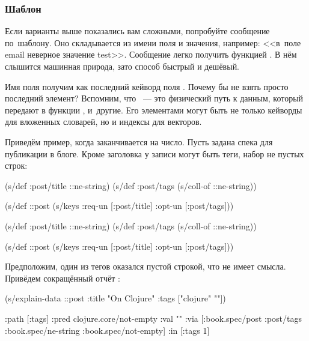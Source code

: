 \subsubsection*{Шаблон}


Если варианты выше показались вам сложными, попробуйте сообщение по~шаблону. Оно
складывается из имени поля и значения, например: <<в~поле email неверное
значение test>>. Сообщение легко получить функцией . В нём
слышится машинная природа, зато способ быстрый и дешёвый.

Имя поля получим как последний кейворд поля . Почему бы не взять
просто последний элемент? Вспомним, что ~--- это физический путь к данным,
который передают в функции ,  и~другие. Его
элементами могут быть не только кейворды для вложенных словарей, но и индексы
для векторов.

Приведём пример, когда  заканчивается на число. Пусть задана
спека  для публикации в блоге. Кроме заголовка у записи могут
быть теги, набор не пустых строк:

\ifnarrow

\begin{clojure}
(s/def :post/title ::ne-string)
(s/def :post/tags
  (s/coll-of ::ne-string))

(s/def ::post
  (s/keys :req-un [:post/title]
          :opt-un [:post/tags]))
\end{clojure}

\else

\begin{clojure}
(s/def :post/title ::ne-string)
(s/def :post/tags (s/coll-of ::ne-string))

(s/def ::post (s/keys :req-un [:post/title]
                      :opt-un [:post/tags]))
\end{clojure}

\fi

Предположим, один из тегов оказался пустой строкой, что не имеет
смысла. Привёдем сокращённый отчёт :

\ifnarrow

\begin{clojure}
(s/explain-data ::post
  {:title "On Clojure"
   :tags ["clojure" ""]})

{:path [:tags]
 :pred clojure.core/not-empty
 :val ""
 :via [:book.spec/post
       :post/tags
       :book.spec/ne-string
       :book.spec/not-empty]
 :in [:tags 1]}
\end{clojure}

